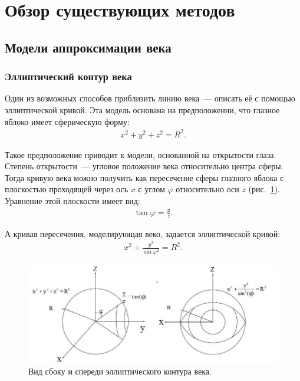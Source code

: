 \documentclass[12pt,a4paper]{article} %
\begin{document}
\newpage
\section{Обзор существующих методов}
\subsection{Модели аппроксимации века}

\subsubsection{Эллиптический контур века}

Один из возможных способов приблизить линию века~--- описать её с помощью эллиптической кривой. Эта модель основана на предположении, что глазное яблоко имеет сферическую форму:
\begin{gather}\label{sphear}
	x^2+y^2+z^2= R^2.
\end{gather}

Такое предположение приводит к модели, основанной на открытости глаза. Степень открытости~--- угловое положение века относительно центра сферы. Тогда кривую века можно получить как пересечение сферы глазного яблока с плоскостью проходящей через ось $x$ с углом $\varphi$ относительно оси $z$ (рис.~\ref{fig:glaz4}). Уравнение этой плоскости имеет вид:
\begin{gather}\label{el1}
	\tan{\varphi}= \frac{y}{z}.
\end{gather}

А кривая пересечения, моделирующая веко, задается эллиптической кривой:
\begin{gather}\label{el2}
	x^2+\frac{y^2}{\sin{\varphi}^2}=R^2.
\end{gather}

\begin{figure}[h]
	
	\centering
	
	\includegraphics[width=0.8\linewidth]{glaz4.jpg}
	
	\caption{Вид сбоку и спереди эллиптического контура века.}
	
	\label{fig:glaz4}
	
\end{figure}
\end{document}
